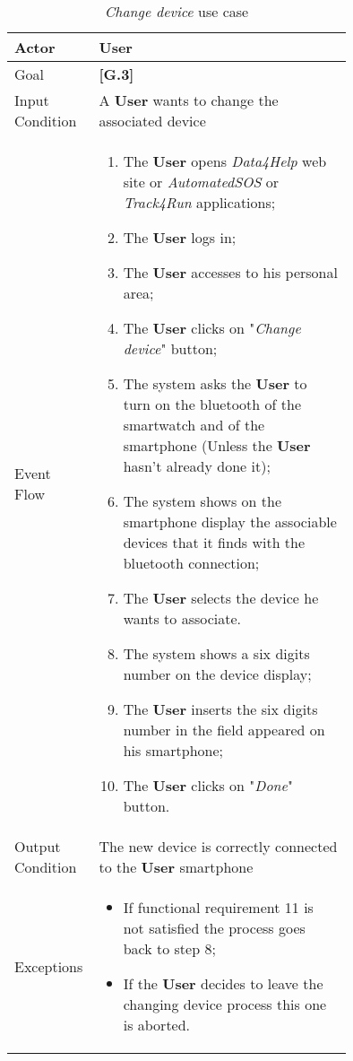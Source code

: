 \begin{center}
\begin{table}
\begin{tabular}{ | l | p{0.75\linewidth} | }
  \hline
    Actor & \textbf{User} \\ \hline
    Goal & \textbf{[G.3]} \\ \hline
    Input Condition & A \textbf{User} wants to change the associated device\\ \hline
    Event Flow & \begin{minipage}[t]{0.7\textwidth}
      \begin{enumerate}
        \item The \textbf{User} opens \textit{Data4Help} web site or \textit{AutomatedSOS} or \textit{Track4Run} applications;
        \item The \textbf{User} logs in;
        \item The \textbf{User} accesses to his personal area;
        \item The \textbf{User} clicks on "\textit{Change device}" button;
        \item The system asks the \textbf{User} to turn on the bluetooth of the smartwatch and of the smartphone (Unless the \textbf{User} hasn't already done it);
        \item The system shows on the smartphone display the associable devices that it finds with the bluetooth connection;
        \item The \textbf{User} selects the device he wants to associate.
        \item The system shows a six digits number on the device display;
        \item The \textbf{User} inserts the six digits number in the field appeared on his smartphone;
        \item The \textbf{User} clicks on "\textit{Done}" button.
      \end{enumerate}
    \smallskip
  \end{minipage} \\ \hline
  Output Condition & The new device is correctly connected to the \textbf{User} smartphone \\ \hline
  Exceptions & \begin{minipage}[t]{0.7\textwidth}
    \begin{itemize}
      \smallskip
      \item If functional requirement 11 is not satisfied the process goes back to step 8;
      \item If the \textbf{User} decides to leave the changing device process this one is aborted.
    \end{itemize}
    \smallskip
  \end{minipage}  \\ \hline
\end{tabular}
\caption{\textit{Change device} use case}
\label{table:changeDeviceTable}
\end{table}
\end{center}

